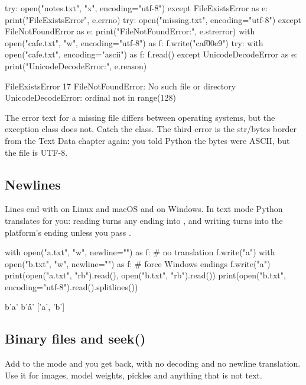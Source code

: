 \begin{pycode}
try:
    open("notes.txt", "x", encoding="utf-8")
except FileExistsError as e:
    print("FileExistsError", e.errno)
try:
    open("missing.txt", encoding="utf-8")
except FileNotFoundError as e:
    print("FileNotFoundError:", e.strerror)
with open("cafe.txt", "w", encoding="utf-8") as f:
    f.write("caf\u00e9\n")
try:
    with open("cafe.txt", encoding="ascii") as f:
        f.read()
except UnicodeDecodeError as e:
    print("UnicodeDecodeError:", e.reason)
\end{pycode}
\begin{rawcode}
FileExistsError 17
FileNotFoundError: No such file or directory
UnicodeDecodeError: ordinal not in range(128)
\end{rawcode}

The error text for a missing file differs between operating systems, but the exception class
does not. Catch the class. The third error is the str/bytes border from the Text Data chapter
again: you told Python the bytes were ASCII, but the file is UTF-8.

\subsection{Newlines}

Lines end with  on Linux and macOS and  on Windows. In text mode Python translates for you:
reading turns any ending into , and writing turns  into the platform's ending
unless you pass .

\begin{pycode}
with open("a.txt", "w", newline="") as f:        # no translation
    f.write("a\nb\n")
with open("b.txt", "w", newline="\r\n") as f:    # force Windows endings
    f.write("a\nb\n")
print(open("a.txt", "rb").read(), open("b.txt", "rb").read())
print(open("b.txt", encoding="utf-8").read().splitlines())
\end{pycode}
\begin{rawcode}
b'a\nb\n' b'a\r\nb\r\n'
['a', 'b']
\end{rawcode}

\subsection{Binary files and seek()}

Add  to the mode and you get  back, with no decoding and no newline
translation. Use it for images, model weights, pickles and anything that is not text.

